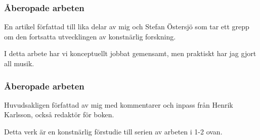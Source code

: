 \documentclass{beamer}
\begin{document}

\begin{frame}
\frametitle{Åberopade arbeten}


En artikel författad till lika delar av mig och Stefan Östersjö som tar ett grepp om den fortsatta utvecklingen av konstnärlig forskning.

\vspace{0.4cm}


I detta arbete har vi konceptuellt jobbat gemensamt, men praktiskt har jag gjort all musik.

\vspace{0.4cm}


\end{frame}


\begin{frame}
\frametitle{Åberopade arbeten}


Huvudsakligen författad av mig med kommentarer och inpass från Henrik Karlsson, också redaktör för boken.

\vspace{0.4cm}


Detta verk är en konstnärlig förstudie till serien av arbeten i 1-2 ovan.

\vspace{0.4cm}

\end{frame}
\end{document}
